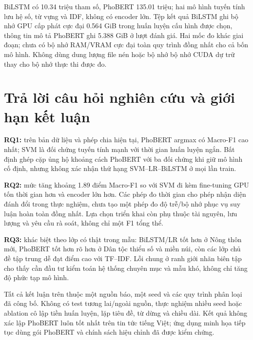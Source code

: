 BiLSTM có 10.34 triệu tham số, PhoBERT 135.01 triệu; hai mô hình tuyến tính lưu hệ số, từ vựng và IDF, không có encoder lớn. Tệp kết quả BiLSTM ghi bộ nhớ GPU cấp phát cực đại 0.564 GiB trong huấn luyện cấu hình được chọn, thông tin mô tả PhoBERT ghi 5.388 GiB ở lượt đánh giá. Hai mốc đo khác giai đoạn; chưa có bộ nhớ RAM/VRAM cực đại toàn quy trình đồng nhất cho cả bốn mô hình. Không dùng dung lượng file nén hoặc bộ nhớ bộ nhớ CUDA dự trữ thay cho bộ nhớ thực thi được đo.

\section{Trả lời câu hỏi nghiên cứu và giới hạn kết luận}
\textbf{RQ1:} trên bản dữ liệu và phép chia hiện tại, PhoBERT argmax có Macro-F1 cao nhất; SVM là đối chứng tuyến tính mạnh với thời gian huấn luyện ngắn. Bất định ghép cặp ủng hộ khoảng cách PhoBERT với ba đối chứng khi giữ mô hình cố định, nhưng không xác nhận thứ hạng SVM--LR--BiLSTM ở mọi lần train.

\textbf{RQ2:} mức tăng khoảng 1.89 điểm Macro-F1 so với SVM đi kèm fine-tuning GPU tốn thời gian hơn và encoder lớn hơn. Các phép đo thời gian cho phép nhận diện đánh đổi trong thực nghiệm, chưa tạo một phép đo độ trễ/bộ nhớ phục vụ suy luận hoàn toàn đồng nhất. Lựa chọn triển khai còn phụ thuộc tài nguyên, lưu lượng và yêu cầu rà soát, không chỉ một F1 tổng thể.

\textbf{RQ3:} khác biệt theo lớp có thật trong mẫu: BiLSTM/LR tốt hơn ở Nông thôn mới, PhoBERT tốt hơn rõ hơn ở Dân tộc thiểu số và miền núi, còn các lớp chủ đề tập trung dễ đạt điểm cao với TF--IDF. Lỗi chung ở ranh giới nhãn biên tập cho thấy cần đầu tư kiểm toán hệ thống chuyên mục và mẫu khó, không chỉ tăng độ phức tạp mô hình.

Tất cả kết luận trên thuộc một nguồn báo, một seed và các quy trình phân loại đã công bố. Không có test tương lai/ngoài nguồn, thực nghiệm nhiều seed hoặc ablation cô lập tiền huấn luyện, lặp tiêu đề, từ dừng và chiều dài. Kết quả không xác lập PhoBERT luôn tốt nhất trên tin tức tiếng Việt; ứng dụng minh họa tiếp tục dùng gói PhoBERT và chính sách hiệu chỉnh đã được kiểm chứng.
